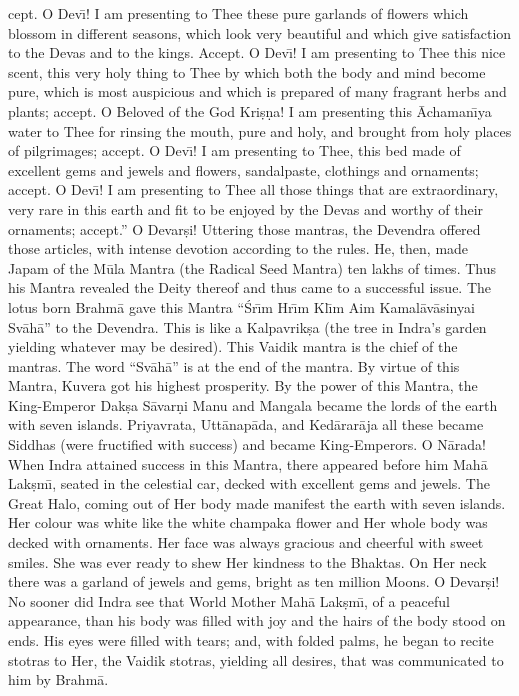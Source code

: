cept. O Dev\={\i}! I am presenting to Thee these pure garlands of flowers which blossom in different seasons, which look very beautiful and which give satisfaction to the Devas and to the kings. Accept. O Dev\={\i}! I am presenting to Thee this nice scent, this very holy thing to Thee by which both the body and mind become pure, which is most auspicious and which is prepared of many fragrant herbs and plants; accept. O Beloved of the God Kri\d{s}\d{n}a! I am presenting this \=Achaman\={\i}ya water to Thee for rinsing the mouth, pure and holy, and brought from holy places of pilgrimages; accept. O Dev\={\i}! I am presenting to Thee, this bed made of excellent gems and jewels and flowers, sandalpaste, clothings and ornaments; accept. O Dev\={\i}! I am presenting to Thee all those things that are extraordinary, very rare in this earth and fit to be enjoyed by the Devas and worthy of their ornaments; accept.'' O Devar\d{s}i! Uttering those mantras, the Devendra offered those articles, with intense devotion according to the rules. He, then, made Japam of the M\=ula Mantra (the Radical Seed Mantra) ten lakhs of times. Thus his Mantra revealed the Deity thereof and thus came to a successful issue. The lotus born Brahm\=a gave this Mantra ``\'Sr\={\i}m Hr\={\i}m Kl\={\i}m Aim Kamal\=av\=asinyai Sv\=ah\=a'' to the Devendra. This is like a Kalpavrik\d{s}a (the tree in Indra's garden yielding whatever may be desired). This Vaidik mantra is the chief of the mantras. The word ``Sv\=ah\=a'' is at the end of the mantra. By virtue of this Mantra, Kuvera got his highest prosperity. By the power of this Mantra, the King-Emperor Dak\d{s}a S\=avar\d{n}i Manu and Mangala became the lords of the earth with seven islands. Priyavrata, Utt\=anap\=ada, and Ked\=arar\=aja all these became Siddhas (were fructified with success) and became King-Emperors. O N\=arada! When Indra attained success in this Mantra, there appeared before him Mah\=a Lak\d{s}m\={\i}, seated in the celestial car, decked with excellent gems and jewels. The Great Halo, coming out of Her body made manifest the earth with seven islands. Her colour was white like the white champaka flower and Her whole body was decked with ornaments. Her face was always gracious and cheerful with sweet smiles. She was ever ready to shew Her kindness to the Bhaktas. On Her neck there was a garland of jewels and gems, bright as ten million Moons. O Devar\d{s}i! No sooner did Indra see that World Mother Mah\=a Lak\d{s}m\={\i}, of a peaceful appearance, than his body was filled with joy and the hairs of the body stood on ends. His eyes were filled with tears; and, with folded palms, he began to recite stotras to Her, the Vaidik stotras, yielding all desires, that was communicated to him by Brahm\=a.

